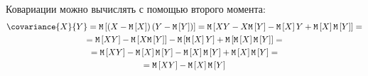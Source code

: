 \documentclass[12pt,a4paper]{article}
\begin{document}
\begin{enumerate}
        Ковариации можно вычислять с помощью второго момента:
        \begin{multline}
            \covariance{X}{Y}
            = \expectation{\left ( X - \expectation{X} \right ) \left ( Y - \expectation{Y} \right )}
            = \expectation{X Y - X \expectation{Y} - \expectation{X} Y + \expectation{X} \expectation{Y}} = \\
%
            = \expectation{X Y} - \expectation{X \expectation{Y}} - \expectation{\expectation{X} Y} + \expectation{\expectation{X} \expectation{Y}} = \\
%
            = \expectation{X Y} - \expectation{X} \expectation{Y} - \expectation{X} \expectation{Y} + \expectation{X} \expectation{Y} = \\
            = \expectation{X Y} - \expectation{X} \expectation{Y}
        \end{multline}


\end{enumerate}
\end{document}
